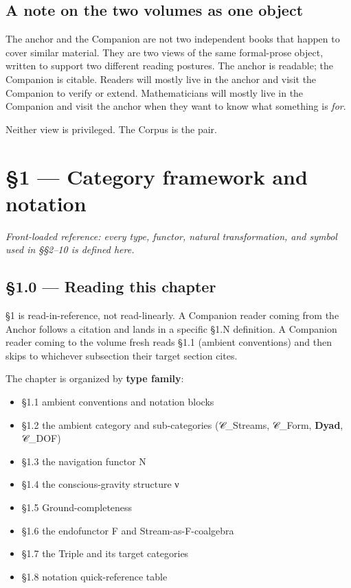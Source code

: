 \documentclass[11pt, openany]{book}
\newcommand{\sectionbreak}{\clearpage}
\begin{document}
\section{A note on the two volumes as one object}

The anchor and the Companion are not two independent books that happen to cover similar material. They are two views of the same formal-prose object, written to support two different reading postures. The anchor is readable; the Companion is citable. Readers will mostly live in the anchor and visit the Companion to verify or extend. Mathematicians will mostly live in the Companion and visit the anchor when they want to know what something is \textit{for}.

Neither view is privileged. The Corpus is the pair.

\chapter{§1 — Category framework and notation}


\textit{Front-loaded reference: every type, functor, natural transformation, and symbol used in §§2–10 is defined here.}

\sectionbreak

\section{§1.0 --- Reading this chapter}

§1 is read-in-reference, not read-linearly. A Companion reader coming from the Anchor follows a citation and lands in a specific §1.N definition. A Companion reader coming to the volume fresh reads §1.1 (ambient conventions) and then skips to whichever subsection their target section cites.

The chapter is organized by \textbf{type family}:
\begin{itemize}
\item §1.1 ambient conventions and notation blocks
\item §1.2 the ambient category and sub-categories (𝒞\_\allowbreak{}Streams, 𝒞\_\allowbreak{}Form, \textbf{Dyad}, 𝒞\_\allowbreak{}DOF)
\item §1.3 the navigation functor N
\item §1.4 the conscious-gravity structure ν
\item §1.5 Ground-completeness
\item §1.6 the endofunctor F and Stream-as-F-coalgebra
\item §1.7 the Triple and its target categories
\item §1.8 notation quick-reference table
\end{itemize}
\end{document}
